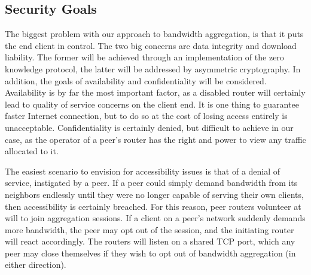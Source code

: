 \documentclass[12pt]{article}
\begin{document}
	\subsection{Security Goals}

		The biggest problem with our approach to bandwidth aggregation, is that it puts the end client in control. The two big concerns are data integrity and download liability. The former will be achieved through an implementation of the zero knowledge protocol, the latter will be addressed by asymmetric cryptography. In addition, the goals of availability and confidentiality will be considered. Availability is by far the most important factor, as a disabled router will certainly lead to quality of service concerns on the client end. It is one thing to guarantee faster Internet connection, but to do so at the cost of losing access entirely is unacceptable. Confidentiality is certainly denied, but difficult to achieve in our case, as the operator of a peer's router has the right and power to view any traffic allocated to it.

		The easiest scenario to envision for accessibility issues is that of a denial of service, instigated by a peer. If a peer could simply demand bandwidth from its neighbors endlessly until they were no longer capable of serving their own clients, then accessibility is certainly breached. For this reason, peer routers volunteer at will to join aggregation sessions. If a client on a peer's network suddenly demands more bandwidth, the peer may opt out of the session, and the initiating router will react accordingly. The routers will listen on a shared TCP port, which any peer may close themselves if they wish to opt out of bandwidth aggregation (in either direction).
\end{document}
